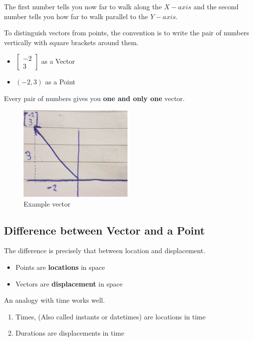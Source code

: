 \documentclass{article}
\begin{document}
The first number tells you now far to walk along the $X-axis$ and the second number tells you how far to walk parallel to the $Y-axis$.

To distinguish vectors from points, the convention is to write the pair of numbers vertically with square brackets around them.

\begin{itemize}
    \item $\begin{bmatrix} -2 \\ 3 \end{bmatrix}$ as a Vector
    \item $(-2, 3)$ as a Point
\end{itemize}

Every pair of numbers gives you \textbf{one and only one} vector.


\begin{figure}[h]
    \centering
    \includegraphics[width=0.5\textwidth, height=0.35\textwidth]{la_3.png}
    \caption{Example vector}
    \label{fig3}
\end{figure}

\begin{center}
    \section{Difference between Vector and a Point}    
\end{center}

The difference is precisely that between location and displacement.

\begin{itemize}
    \item Points are \textbf{locations} in space
    \item Vectors are \textbf{displacement} in space
\end{itemize}

An analogy with time works well.

\begin{enumerate}
    \item Times, (Also called instants or datetimes) are locations in time
    \item Durations are displacements in time
\end{enumerate}
\end{document}
